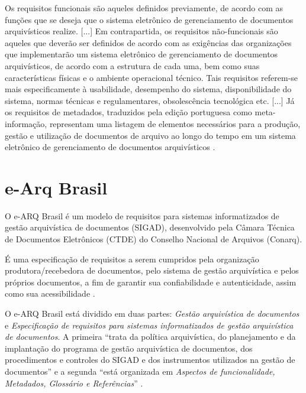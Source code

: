 \documentclass[a4paper,11pt,openright,twoside,english,brazil]{abntex2}
\begin{document}
\begin{citacao}
Os requisitos funcionais são aqueles definidos previamente, de acordo com as
funções que se deseja que o sistema eletrônico de gerenciamento de documentos
arquivísticos realize. [...] Em contrapartida, os requisitos não-funcionais são
aqueles que deverão ser definidos de acordo com as exigências das organizações
que implementarão um sistema eletrônico de gerenciamento de documentos
arquivísticos, de acordo com a estrutura de cada uma, bem como suas
características físicas e o ambiente operacional técnico. Tais requisitos
referem-se mais especificamente à usabilidade, desempenho do sistema,
disponibilidade do sistema, normas técnicas e regulamentares, obsolescência
tecnológica etc. [...] Já os requisitos de metadados, traduzidos pela edição
portuguesa como meta-informação, representam uma listagem de elementos
necessários para a produção, gestão e utilização de documentos de arquivo ao
longo do tempo em um sistema eletrônico de gerenciamento de documentos
arquivísticos \cite{lima2004}.
\end{citacao}

\section{e-Arq Brasil}
\label{sec-earq-brasil}

O e-ARQ Brasil é um modelo de requisitos para sistemas informatizados de gestão
arquivística de documentos (SIGAD), desenvolvido pela Câmara Técnica de
Documentos Eletrônicos (CTDE) do Conselho Nacional de Arquivos (Conarq).

\begin{citacao}
É uma especificação de requisitos a serem cumpridos pela organização
produtora/recebedora de documentos, pelo sistema de gestão arquivística e pelos
próprios documentos, a fim de garantir sua confiabilidade e autenticidade,
assim como sua acessibilidade \cite[p.~9]{conarq2009}.
\end{citacao}

O e-ARQ Brasil está dividido em duas partes: \emph{Gestão arquivística de
documentos} e \emph{Especificação de requisitos para sistemas informatizados de
gestão arquivística de documentos}. A primeira ``trata da política arquivística,
do planejamento e da implantação do programa de gestão arquivística de
documentos, dos procedimentos e controles do SIGAD e dos instrumentos utilizados
na gestão de documentos'' e a segunda ``está organizada em \emph{Aspectos de
funcionalidade, Metadados, Glossário e Referências}'' \cite[p.~16]{conarq2009}.
\end{document}

